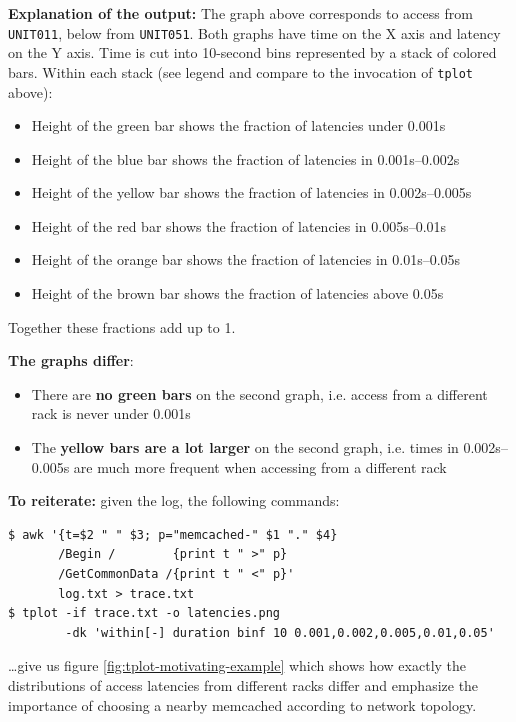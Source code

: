 \documentclass{article}
\begin{document}
\textbf{Explanation of the output:} The graph above corresponds to access from \verb|UNIT011|, below from \verb|UNIT051|. Both graphs have time on the X axis and latency on the Y axis. Time is cut into 10-second bins represented by a stack of colored bars. Within each stack (see legend and compare to the invocation of \verb|tplot| above):
\begin{itemize}
\item Height of the green bar shows the fraction of latencies under 0.001s
\item Height of the blue bar shows the fraction of latencies in 0.001s--0.002s
\item Height of the yellow bar shows the fraction of latencies in 0.002s--0.005s
\item Height of the red bar shows the fraction of latencies in 0.005s--0.01s
\item Height of the orange bar shows the fraction of latencies in 0.01s--0.05s
\item Height of the brown bar shows the fraction of latencies above 0.05s
\end{itemize}

Together these fractions add up to 1.

\textbf{The graphs differ}:
\begin{itemize}
\item There are \textbf{no green bars} on the second graph, i.e. access from a different rack is never under 0.001s
\item The \textbf{yellow bars are a lot larger} on the second graph, i.e. times in 0.002s--0.005s are much more frequent when accessing from a different rack
\end{itemize}

\textbf{To reiterate:} given the log, the following commands:

\begin{verbatim}
$ awk '{t=$2 " " $3; p="memcached-" $1 "." $4}
       /Begin /        {print t " >" p} 
       /GetCommonData /{print t " <" p}'
       log.txt > trace.txt
$ tplot -if trace.txt -o latencies.png
        -dk 'within[-] duration binf 10 0.001,0.002,0.005,0.01,0.05'
\end{verbatim}

\ldots give us figure \ref{fig:tplot-motivating-example} which shows how exactly the distributions of access latencies from different racks differ and emphasize the importance of choosing a nearby memcached according to network topology.
\end{document}
